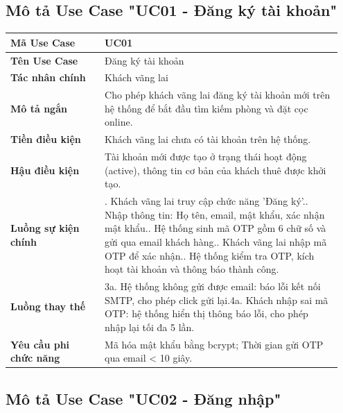 \documentclass[a4paper,oneside]{report}
\begin{document}
\subsection{Mô tả Use Case "UC01 - Đăng ký tài khoản"}

\begin{longtable}[]{@{}>{\RaggedRight\arraybackslash}p{0.27\linewidth}>{\RaggedRight\arraybackslash}p{0.68\linewidth}@{}}
\toprule
\textbf{Mã Use Case} & UC01\tabularnewline
\midrule
\endhead
\textbf{Tên Use Case} & Đăng ký tài khoản\tabularnewline
\textbf{Tác nhân chính} & Khách vãng lai\tabularnewline
\textbf{Mô tả ngắn} & Cho phép khách vãng lai đăng ký tài khoản mới trên
hệ thống để bắt đầu tìm kiếm phòng và đặt cọc online.\tabularnewline
\textbf{Tiền điều kiện} & Khách vãng lai chưa có tài khoản trên hệ
thống.\tabularnewline
\textbf{Hậu điều kiện} & Tài khoản mới được tạo ở trạng thái hoạt động
(active), thông tin cơ bản của khách thuê được khởi tạo.\tabularnewline
\textbf{Luồng sự kiện chính} & 1. Khách vãng lai truy
cập chức năng 'Đăng ký'.\newline 2. Nhập thông tin: Họ tên, email,
mật khẩu, xác nhận mật khẩu.\newline 3. Hệ thống sinh mã OTP gồm 6
chữ số và gửi qua email khách hàng.\newline 4. Khách vãng lai nhập
mã OTP để xác nhận.\newline 5. Hệ thống kiểm tra OTP, kích hoạt tài
khoản và thông báo thành công.\tabularnewline
\textbf{Luồng thay thế} & 3a. Hệ thống không gửi được
email: báo lỗi kết nối SMTP, cho phép click gửi lại.\newline 4a.
Khách nhập sai mã OTP: hệ thống hiển thị thông báo lỗi, cho phép nhập
lại tối đa 5 lần.\tabularnewline
\textbf{Yêu cầu phi chức năng} & Mã hóa mật khẩu bằng bcrypt; Thời gian
gửi OTP qua email \textless{} 10 giây.\tabularnewline
\bottomrule
\end{longtable}

\subsection{Mô tả Use Case "UC02 - Đăng nhập"}
\end{document}
